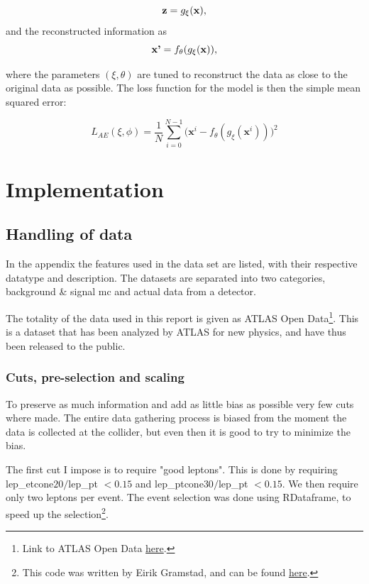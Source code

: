 \documentclass[ reprint, amsmath,amssymb, aps, nofootinbib]{revtex4-2}
\begin{document}
\begin{equation*}
    \textbf{z} = g_{\xi}(\bf{x}),
\end{equation*}
and the reconstructed information as 
\begin{equation*}
    \textbf{x'} = f_{\theta}(g_{\xi}(\bf{x})),
\end{equation*}

where the parameters $(\xi, \theta)$ are tuned to reconstruct the data as close to the original data as possible. The loss function for the model is then the simple mean squared error:

\begin{equation*}
    L_{AE}(\xi, \phi)= \frac{1}{N} \sum_{i=0}^{N-1}\bigg( \textbf{x}^i - f_{\theta}(g_{\xi}(\textbf{x}^i))\bigg)^2
\end{equation*}


\newpage
\section{Implementation}

\subsection{Handling of data}

In the appendix the features used in the data set are listed, with their respective datatype and description. The datasets are separated into two categories, background \& signal mc and actual data from a detector. 

The totality of the data used in this report is given as ATLAS Open Data\footnote{Link to ATLAS Open Data \href{https://atlas.cern/resources/opendata}{here}.}. This is a dataset that has been analyzed by ATLAS for new physics, and have thus been released to the public. 

\subsubsection{Cuts, pre-selection and scaling}
To preserve as much information and add as little bias as possible very few cuts where made. The entire data gathering process is biased from the moment the data is collected at the collider, but even then it is good to try to minimize the bias. \par

The first cut I impose is to require "good leptons". This is done by requiring lep\_etcone$20/$lep\_pt $< 0.15$ and lep\_ptcone$30/$lep\_pt $< 0.15$. We then require only two leptons per event. The event selection was done using RDataframe\cite{rene_al._2019}, to speed up the selection\footnote{This code was written by Eirik Gramstad, and can be found \href{https://github.uio.no/zpath/software/blob/eirik-dev/Notebooks/ATLASOpenData/13TeV/RDataFrameToDF.ipynb}{here}.}.\par 
\end{document}

